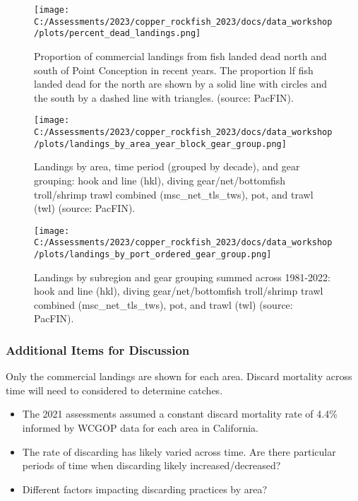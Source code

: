 \documentclass[
]{article}
\providecommand{\tightlist}{%
  \setlength{\itemsep}{0pt}\setlength{\parskip}{0pt}}
\begin{document}
\begin{figure}
\centering
\texttt{[image: C:/Assessments/2023/copper\_rockfish\_2023/docs/data\_workshop/plots/percent\_dead\_landings.png]}
\caption{Proportion of commercial landings from fish landed dead north
and south of Point Conception in recent years. The proportion lf fish
landed dead for the north are shown by a solid line with circles and the
south by a dashed line with triangles. (source:
PacFIN).\label{fig:com-prop-dead}}
\end{figure}

\begin{figure}
\centering
\texttt{[image: C:/Assessments/2023/copper\_rockfish\_2023/docs/data\_workshop/plots/landings\_by\_area\_year\_block\_gear\_group.png]}
\caption{Landings by area, time period (grouped by decade), and gear
grouping: hook and line (hkl), diving gear/net/bottomfish troll/shrimp
trawl combined (msc\_net\_tls\_tws), pot, and trawl (twl) (source:
PacFIN).\label{fig:com-gear-year}}
\end{figure}

\begin{figure}
\centering
\texttt{[image: C:/Assessments/2023/copper\_rockfish\_2023/docs/data\_workshop/plots/landings\_by\_port\_ordered\_gear\_group.png]}
\caption{Landings by subregion and gear grouping summed across
1981-2022: hook and line (hkl), diving gear/net/bottomfish troll/shrimp
trawl combined (msc\_net\_tls\_tws), pot, and trawl (twl) (source:
PacFIN).\label{fig:com-port-gear}}
\end{figure}

\hypertarget{additional-items-for-discussion}{%
\subsubsection{Additional Items for
Discussion}\label{additional-items-for-discussion}}

Only the commercial landings are shown for each area. Discard mortality
across time will need to considered to determine catches.

\begin{itemize}
\tightlist
\item
  The 2021 assessments assumed a constant discard mortality rate of
  4.4\% informed by WCGOP data for each area in California.
\item
  The rate of discarding has likely varied across time. Are there
  particular periods of time when discarding likely increased/decreased?
\item
  Different factors impacting discarding practices by area?
\end{itemize}
\end{document}
